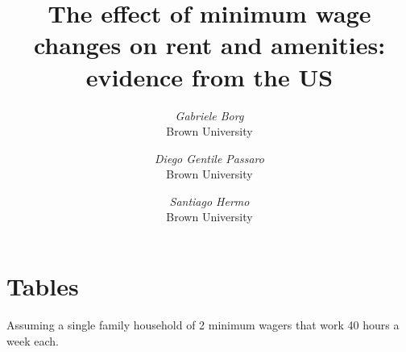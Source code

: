 \documentclass{article}
\title{The effect of minimum wage changes on rent and amenities: evidence from the US}
\author{
	\textit{Gabriele Borg} \\
	\small Brown University 
	\and
	\textit{Diego Gentile Passaro} \\
	\small Brown University
	\and
	\textit{Santiago Hermo} \\
	\small Brown University
}
\begin{document}
\maketitle

\section*{Tables}

Assuming a single family household of 2 minimum wagers that work 40 hours a week each. 
\begin{table}[h!]
\centering
\resizebox{\textwidth}{!}{

}
\end{table}
\end{document}
